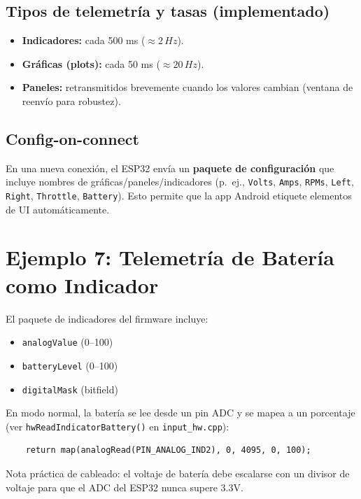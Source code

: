 \subsection{Tipos de telemetría y tasas (implementado)}
\begin{itemize}
    \item \textbf{Indicadores:} cada 500 ms (\(\approx 2\,Hz\)).
    \item \textbf{Gráficas (plots):} cada 50 ms (\(\approx 20\,Hz\)).
    \item \textbf{Paneles:} retransmitidos brevemente cuando los valores cambian (ventana de reenvío para robustez).
\end{itemize}

\subsection{Config-on-connect}
En una nueva conexión, el ESP32 envía un \textbf{paquete de configuración} que incluye nombres de gráficas/paneles/indicadores
(p.\ ej., \texttt{Volts}, \texttt{Amps}, \texttt{RPMs}, \texttt{Left}, \texttt{Right}, \texttt{Throttle}, \texttt{Battery}).
Esto permite que la app Android etiquete elementos de UI automáticamente.

\section{Ejemplo 7: Telemetría de Batería como Indicador}
\label{sec:example-battery}

El paquete de indicadores del firmware incluye:
\begin{itemize}
    \item \texttt{analogValue} (0--100)
    \item \texttt{batteryLevel} (0--100)
    \item \texttt{digitalMask} (bitfield)
\end{itemize}

En modo normal, la batería se lee desde un pin ADC y se mapea a un porcentaje (ver \texttt{hwReadIndicatorBattery()}
en \texttt{input\_hw.cpp}):

\begin{verbatim}
    return map(analogRead(PIN_ANALOG_IND2), 0, 4095, 0, 100);
\end{verbatim}

\noindent Nota práctica de cableado: el voltaje de batería debe escalarse con un divisor de voltaje para que el ADC del ESP32
nunca supere 3.3V.

